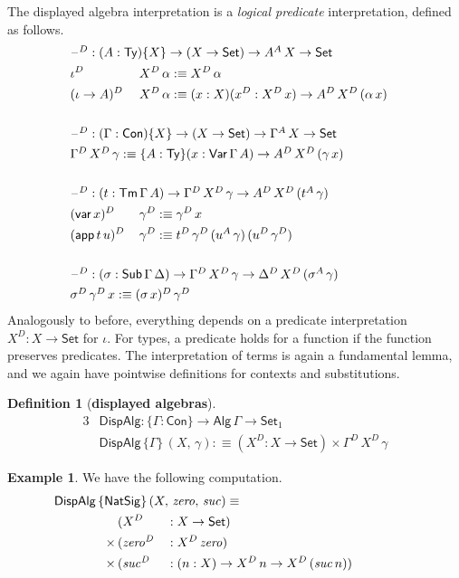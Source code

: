 \documentclass[12pt,a4paper,twoside,openany]{book}
\theoremstyle{remark}
\theoremstyle{definition}
\newtheorem{mydefinition}{Definition}
\newtheorem{myexample}{Example}
\theoremstyle{theorem}
\newcommand{\mi}[1]{\mathit{#1}}
\newcommand{\ms}[1]{\mathsf{#1}}
\newcommand{\Con}{\mathsf{Con}}
\newcommand{\Sub}{\mathsf{Sub}}
\newcommand{\Tm}{\mathsf{Tm}}
\newcommand{\Ty}{\mathsf{Ty}}
\newcommand{\blank}{\mathord{\hspace{1pt}\text{--}\hspace{1pt}}}
\newcommand{\Set}{\mathsf{Set}}
\newcommand{\Var}{\ms{Var}}
\newcommand{\var}{\ms{var}}
\newcommand{\app}{\ms{app}}
\newcommand{\Alg}{\ms{Alg}}
\newcommand{\DispAlg}{\ms{DispAlg}}
\newcommand{\defn}{:\equiv}
\begin{document}
The displayed algebra interpretation is a \emph{logical predicate}
interpretation, defined as follows.
\begin{alignat*}{3}
  & \rlap{$\blank^D : (A : \Ty)\{X\} \to (X \to \Set) \to A^A\,X \to \Set$}\\
  & \iota^D\,       && X^D\,\alpha \defn X^D\,\alpha \\
  & (\iota\to A)^D\,&& X^D\,\alpha \defn (x : X)(x^D : X^D\,x) \to A^D\,X^D\,(\alpha\,x)\\
  & &&\\
  & \rlap{$\blank^D : (\Gamma : \Con)\{X\} \to (X \to \Set) \to \Gamma^A\,X \to \Set$}\\
  & \rlap{$\Gamma^D\,X^D\,\gamma \defn
       \{A : \Ty\}(x : \Var\,\Gamma\,A) \to A^D\,X^D\,(\gamma\,x)$}\\
  & &&\\
  & \rlap{$\blank^D : (t : \Tm\,\Gamma\,A)
      \to \Gamma^D\,X^D\,\gamma \to A^D\,X^D\,(t^A\,\gamma)$}\\
  & (\var\,x)^D\,&&\gamma^D \defn \gamma^D\,x\\
  & (\app\,t\,u)^D\,&&\gamma^D \defn t^D\,\gamma^D\,(u^A\,\gamma)\,(u^D\,\gamma^D)\\
  & &&\\
  & \rlap{$\blank^D : (\sigma : \Sub\,\Gamma\,\Delta)
      \to \Gamma^D\,X^D\,\gamma \to \Delta^D\,X^D\,(\sigma^A\,\gamma)$}\\
  & \rlap{$\sigma^D\,\gamma^D\,x \defn (\sigma\,x)^D\,\gamma^D$}
\end{alignat*}
Analogously to before, everything depends on a predicate interpretation $X^D : X
\to \Set$ for $\iota$. For types, a predicate holds for a function if the
function preserves predicates. The interpretation of terms is again a
fundamental lemma, and we again have pointwise definitions for contexts and
substitutions.
\begin{mydefinition}[\textbf{displayed algebras}]\label{def:simple-section}
\begin{alignat*}{3}
  & \DispAlg : \{\Gamma : \Con\} \to \Alg\,\Gamma \to \Set_1\\
  & \DispAlg\,\{\Gamma\}\,(X,\,\gamma) \defn (X^D : X \to \Set) \times \Gamma^D\,X^D\,\gamma
\end{alignat*}
\end{mydefinition}
\begin{myexample} We have the following computation.
\begin{alignat*}{3}
  & \hspace{-5em}\rlap{$\DispAlg\,\{\ms{NatSig}\}\,(X,\,\mi{zero},\,\mi{suc}) \equiv$}\\
              & (X^D &&: X \to \Set)\\
      \times\,& (\mi{zero^D} &&: X^D\,\mi{zero})\\
      \times\,& (\mi{suc^D} &&: (n : X) \to X^D\,n \to X^D\,(\mi{suc}\,n))
\end{alignat*}
\end{myexample}
\end{document}
